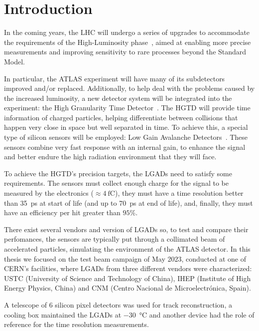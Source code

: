 
\chapter*{Introduction}\label{chap:intro}

In the coming years, the LHC will undergo a series of upgrades to accommodate the requirements of the High-Luminosity phase~\cite{cernHLLHCProject}, aimed at enabling more precise measurements and improving sensitivity to rare processes beyond the Standard Model.

In particular, the ATLAS experiment will have many of its subdetectors improved and/or replaced. Additionally, to help deal with the problems caused by the increased luminosity, a new detector system will be integrated into the experiment: the High Granularity Time Detector~\cite{cernTechnicalDesign}. The HGTD will provide time information of charged particles, helping differentiate between collisions that happen very close in space but well separated in time. To achieve this, a special type of silicon sensors will be employed: Low Gain Avalanche Detectors~\cite{PELLEGRINI201412}. These sensors combine very fast response with an internal gain, to enhance the signal and better endure the high radiation environment that they will face.

To achieve the HGTD's precision targets, the LGADs need to satisfy some requirements. The sensors must collect enough charge for the signal to be measured by the electronics (\(\approx \qty{4}{\femto\coulomb} \)), they must have a time resolution better than \qty{35}{\pico\second} at start of life (and up to \qty{70}{\pico\second} at end of life), and, finally, they must have an efficiency per hit greater than \(95\%\).

There exist several vendors and version of LGADs so, to test and compare their perfomances, the sensors are typically put through a collimated beam of accelerated particles, simulating the environment of the ATLAS detector. In this thesis we focused on the test beam campaign of May 2023, conducted at one of CERN's facilities, where LGADs from three different vendors were characterized: USTC (University of Science and Technology of China), IHEP (Institute of High Energy Physics, China) and CNM (Centro Nacional de Microelectr\'onica, Spain).

A telescope of 6 silicon pixel detectors was used for track reconstruction, a cooling box maintained the LGADs at \qty{-30}{\degreeCelsius} and another device had the role of reference for the time resolution measurements. 

